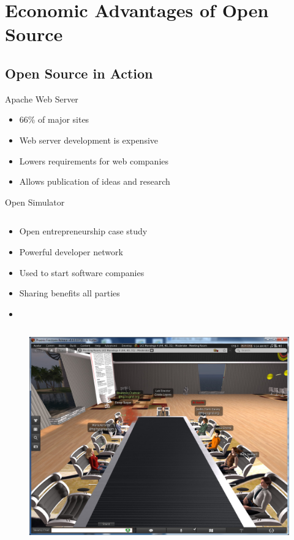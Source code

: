 \section{Economic Advantages of Open Source}\frame{\sectionpage}

\subsection{Open Source in Action}
\begin{frame}{Apache Web Server}
  \begin{itemize}
    \item 66\% of major sites~\cite[p~696]{powell}
    \item Web server development is expensive
    \item Lowers requirements for web companies
    \item Allows publication of ideas and research
  \end{itemize}
\end{frame}

\begin{frame}{Open Simulator}
  \begin{column}{0.45\textwidth}
    \begin{itemize}
      \item Open entrepreneurship case study
      \item Powerful developer network
      \item Used to start software companies
      \item Sharing benefits all parties
      \item\cite{yetis}
    \end{itemize}
  \end{column}
  \begin{column}{0.5\textwidth}\raggedleft{}
    \begin{figure}
      \includegraphics[width=\textwidth]{images/opensim.jpg}
      \caption{\Protect\cite{opensim}}
    \end{figure}
  \end{column}
\end{frame}

